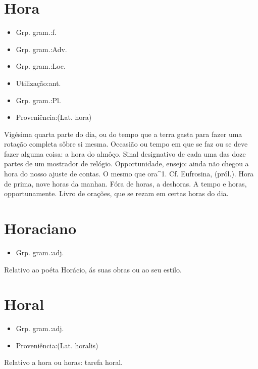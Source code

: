 \documentclass{article}
\begin{document}
\section{Hora}
\begin{itemize}
\item {Grp. gram.:f.}
\end{itemize}
\begin{itemize}
\item {Grp. gram.:Adv.}
\end{itemize}
\begin{itemize}
\item {Grp. gram.:Loc.}
\end{itemize}
\begin{itemize}
\item {Utilização:ant.}
\end{itemize}
\begin{itemize}
\item {Grp. gram.:Pl.}
\end{itemize}
\begin{itemize}
\item {Proveniência:(Lat. \textunderscore hora\textunderscore )}
\end{itemize}
Vigésima quarta parte do dia, ou do tempo que a terra gasta para fazer uma rotação completa sôbre si mesma.
Occasião ou tempo em que se faz ou se deve fazer alguma coisa: \textunderscore a hora do almôço\textunderscore .
Sinal designativo de cada uma das doze partes de um mostrador de relógio.
Opportunidade, ensejo: \textunderscore ainda não chegou a hora do nosso ajuste de contas\textunderscore .
O mesmo que \textunderscore ora\textunderscore ^1. Cf. \textunderscore Eufrosina\textunderscore , (pról.).
\textunderscore Hora de prima\textunderscore , nove horas da manhan.
\textunderscore Fóra de horas\textunderscore , a deshoras.
\textunderscore A tempo e horas\textunderscore , opportunamente.
Livro de orações, que se rezam em certas horas do dia.
\section{Horaciano}
\begin{itemize}
\item {Grp. gram.:adj.}
\end{itemize}
Relativo ao poéta Horácio, ás suas obras ou ao seu estilo.
\section{Horal}
\begin{itemize}
\item {Grp. gram.:adj.}
\end{itemize}
\begin{itemize}
\item {Proveniência:(Lat. \textunderscore horalis\textunderscore )}
\end{itemize}
Relativo a hora ou horas: \textunderscore tarefa horal\textunderscore .
\end{document}
